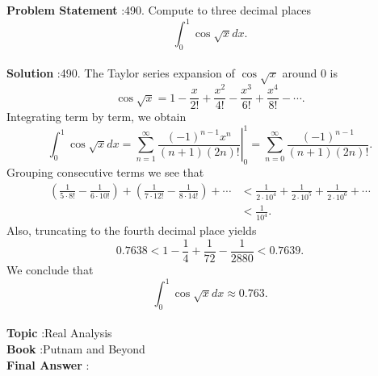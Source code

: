 \documentclass[10pt]{article}
\begin{document}
\textbf{Problem Statement} :490. Compute to three decimal places$$ \int_{0}^{1} \cos \sqrt{x} d x . $$\\
\textbf{Solution} :490. The Taylor series expansion of $\cos \sqrt{x}$ around 0 is$$ \cos \sqrt{x}=1-\frac{x}{2 !}+\frac{x^{2}}{4 !}-\frac{x^{3}}{6 !}+\frac{x^{4}}{8 !}-\cdots . $$Integrating term by term, we obtain$$ \int_{0}^{1} \cos \sqrt{x} d x=\left.\sum_{n=1}^{\infty} \frac{(-1)^{n-1} x^{n}}{(n+1)(2 n) !}\right|_{0} ^{1}=\sum_{n=0}^{\infty} \frac{(-1)^{n-1}}{(n+1)(2 n) !} . $$Grouping consecutive terms we see that$$ \begin{aligned} \left(\frac{1}{5 \cdot 8 !}-\frac{1}{6 \cdot 10 !}\right)+\left(\frac{1}{7 \cdot 12 !}-\frac{1}{8 \cdot 14 !}\right)+\cdots &<\frac{1}{2 \cdot 10^{4}}+\frac{1}{2 \cdot 10^{5}}+\frac{1}{2 \cdot 10^{6}}+\cdots \\ &<\frac{1}{10^{4}} . \end{aligned} $$Also, truncating to the fourth decimal place yields$$ 0.7638<1-\frac{1}{4}+\frac{1}{72}-\frac{1}{2880}<0.7639 . $$We conclude that$$ \int_{0}^{1} \cos \sqrt{x} d x \approx 0.763 . $$\\
\textbf{Topic} :Real Analysis\\
\textbf{Book} :Putnam and Beyond\\
\textbf{Final Answer} :\\
\end{document}
